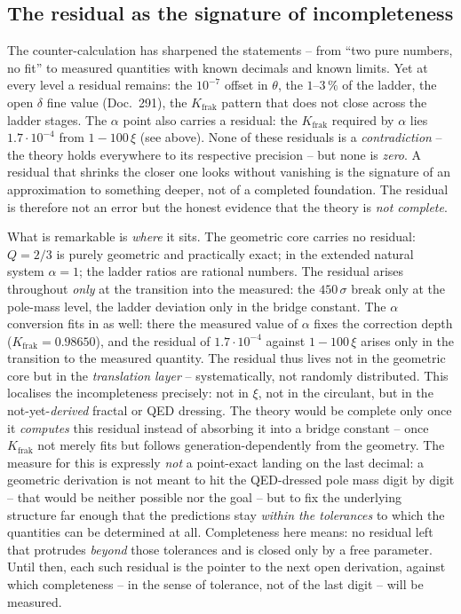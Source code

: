 \subsection{The residual as the signature of incompleteness}
The counter-calculation has sharpened the statements -- from \enquote{two
pure numbers, no fit} to measured quantities with known decimals and known
limits. Yet at every level a residual remains: the $10^{-7}$ offset in
$\theta$, the $1$--$3\,\%$ of the ladder, the open $\delta$ fine value
(Doc.~291), the $K_{\text{frak}}$ pattern that does not close across the
ladder stages. The $\alpha$ point also carries a residual: the $K_{\text{frak}}$ required
by $\alpha$ lies $1.7\cdot10^{-4}$ from $1-100\,\xi$ (see above). None of these residuals is a \emph{contradiction} -- the theory
holds everywhere to its respective precision -- but none is \emph{zero}. A
residual that shrinks the closer one looks without vanishing is the
signature of an approximation to something deeper, not of a completed
foundation. The residual is therefore not an error but the honest evidence
that the theory is \emph{not complete}.

What is remarkable is \emph{where} it sits. The geometric core carries no
residual: $Q=2/3$ is purely geometric and practically exact; in the extended
natural system $\alpha=1$; the ladder ratios are rational numbers. The
residual arises throughout \emph{only} at the transition into the measured:
the $450\,\sigma$ break only at the pole-mass level, the ladder deviation
only in the bridge constant. The $\alpha$ conversion fits in as well: there the measured value of
$\alpha$ fixes the correction depth ($K_{\text{frak}} = 0.98650$), and the
residual of $1.7\cdot10^{-4}$ against $1-100\,\xi$ arises only in the
transition to the measured quantity.
The residual thus lives not in the geometric core but in the
\emph{translation layer} -- systematically, not randomly distributed. This
localises the incompleteness precisely: not in $\xi$, not in the circulant,
but in the not-yet-\emph{derived} fractal or QED dressing. The theory would
be complete only once it \emph{computes} this residual instead of absorbing
it into a bridge constant -- once $K_{\text{frak}}$ not merely fits but
follows generation-dependently from the geometry. The measure for this is
expressly \emph{not} a point-exact landing on the last decimal: a geometric
derivation is not meant to hit the QED-dressed pole mass digit by digit --
that would be neither possible nor the goal -- but to fix the underlying
structure far enough that the predictions stay \emph{within the tolerances}
to which the quantities can be determined at all. Completeness here means: no
residual left that protrudes \emph{beyond} those tolerances and is closed
only by a free parameter. Until then, each such residual is the pointer to
the next open derivation, against which completeness -- in the sense of
tolerance, not of the last digit -- will be measured.
